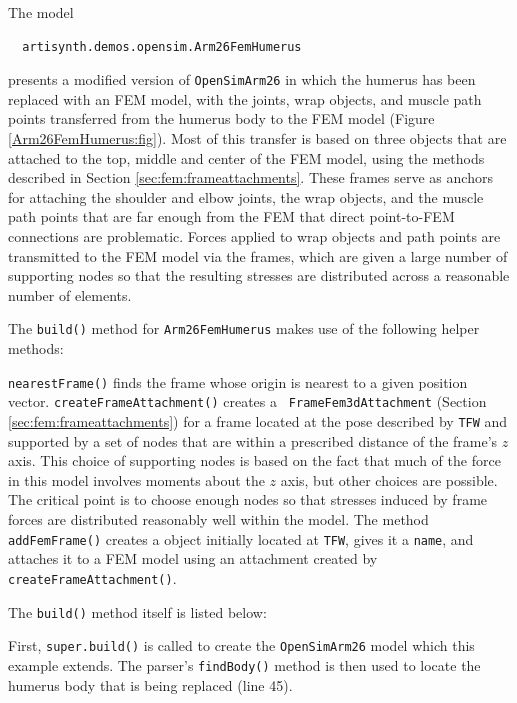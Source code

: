 The model 
\begin{verbatim}
  artisynth.demos.opensim.Arm26FemHumerus
\end{verbatim}
presents a modified version of {\tt OpenSimArm26} in which the humerus has been
replaced with an FEM model, with the joints, wrap objects, and muscle path
points transferred from the humerus body to the FEM model
(Figure \ref{Arm26FemHumerus:fig}). Most of this transfer is based on
three  objects that are attached to the top, middle and
center of the FEM model, using the methods described in Section
\ref{sec:fem:frameattachments}. These frames serve as anchors for attaching the
shoulder and elbow joints, the wrap objects, and the muscle path points that
are far enough from the FEM that direct point-to-FEM connections are
problematic. Forces applied to wrap objects and path points are transmitted to
the FEM model via the frames, which are given a large number of supporting
nodes so that the resulting stresses are distributed across a reasonable number
of elements.

The {\tt build()} method for {\tt Arm26FemHumerus} makes use of the following
helper methods:
%
\lstset{numbers=left} 
\iflatexml

\else
{}

\fi
\lstset{numbers=none}

{\tt nearestFrame()} finds the frame whose origin is nearest to a given
position vector. {\tt createFrameAttachment()} creates a {\tt
FrameFem3dAttachment} (Section \ref{sec:fem:frameattachments}) for a frame
located at the pose described by {\tt TFW} and supported by a set of nodes that
are within a prescribed distance of the frame's $z$ axis.  This choice of
supporting nodes is based on the fact that much of the force in this model
involves moments about the $z$ axis, but other choices are possible.  The
critical point is to choose enough nodes so that stresses induced by frame forces
are distributed reasonably well within the model. The method {\tt
addFemFrame()} creates a  object initially located at
{\tt TFW}, gives it a {\tt name}, and attaches it to a FEM model using an
attachment created by {\tt createFrameAttachment()}.

The {\tt build()} method itself is listed below:
%
\lstset{numbers=left} 
\iflatexml

\else
{}

\fi
\lstset{numbers=none}
%
First, {\tt super.build()} is called to create the {\tt OpenSimArm26} model
which this example extends. The parser's {\tt findBody()} method is then used
to locate the humerus body that is being replaced (line 45).

